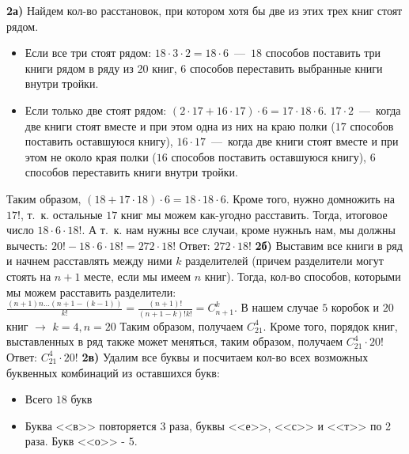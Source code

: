 \documentclass[12pt,a4paper,fleqn]{article}
\begin{document}
{\bf 2а)} Найдем кол-во расстановок, при котором хотя бы две из этих трех книг стоят рядом. 
\begin{itemize}
\item Если все три стоят рядом: $18 \cdot 3 \cdot 2 = 18 \cdot 6$~---~$18$ способов поставить три книги рядом в ряду из $20$ книг, $6$ способов переставить выбранные книги внутри тройки.
\item Если только две стоят рядом: $(2 \cdot 17 + 16 \cdot 17) \cdot 6= 17 \cdot 18 \cdot 6$. $17 \cdot 2$~---~когда две книги стоят вместе и при этом одна из них на краю полки ($17$ способов поставить оставшуюся книгу), $16 \cdot 17$~---~когда две книги стоят вместе и при этом не около края полки ($16$ способов поставить оставшуюся книгу), $6$ способов переставить книги внутри тройки.
\end{itemize}
Таким образом, $(18 + 17 \cdot 18) \cdot 6 = 18 \cdot 18 \cdot 6$. Кроме того, нужно домножить на $17!$, т.~к. остальные $17$ книг мы можем как-угодно расставить. Тогда, итоговое число $18 \cdot 6 \cdot 18!$. \newline
А т.~к. нам нужны все случаи, кроме нужныъ нам, мы должны вычесть: \newline
$20! - 18 \cdot 6 \cdot 18! = 272 \cdot 18!$ \newline
Ответ: $272 \cdot 18!$ \newline \newline
{\bf 2б)} Выставим все книги в ряд и начнем расставлять между ними $k$ разделителей (причем разделители могут стоять на $n + 1$  месте, если мы имеем $n$ книг). Тогда, кол-во способов, которыми мы можем расставить разделители: $\frac{(n + 1)n...(n + 1 - (k - 1))}{k!} = \frac{(n+1)!}{(n+1 - k)!k!} = C_{n+1}^k$. В нашем случае $5$ коробок и $20$ книг $\rightarrow$ $k = 4, n = 20$ \newline
Таким образом, получаем $C_{21}^4$. Кроме того, порядок книг, выставленных в ряд также может меняться, таким образом, получаем $C_{21}^4 \cdot 20!$ \newline
Ответ: $C_{21}^4 \cdot 20!$ \newline \newline
{\bf 2в)} Удалим все буквы и посчитаем кол-во всех возможных буквенных комбинаций из оставшихся букв: 
\begin{itemize}
\item Всего $18$ букв
\item Буква <<в>> повторяется $3$ раза, буквы <<е>>, <<с>> и <<т>> по 2 раза. Букв <<о>> - $5$.
\end{itemize} 
\end{document}
